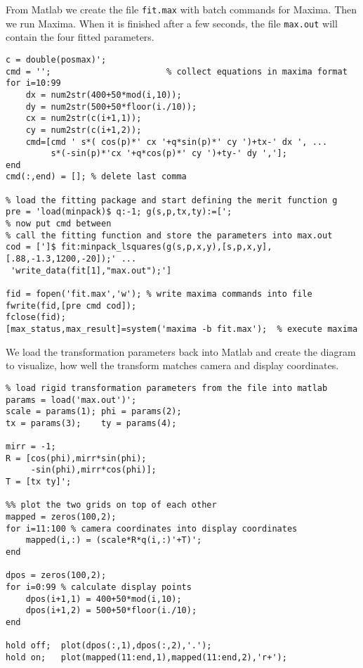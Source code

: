   From Matlab we create the file \verb!fit.max! with batch commands
  for Maxima. Then we run Maxima. When it is finished after a few
  seconds, the file \verb!max.out! will contain the four fitted
  parameters.
 
{\small
\begin{verbatim}
c = double(posmax)';
cmd = '';                       % collect equations in maxima format
for i=10:99
    dx = num2str(400+50*mod(i,10));
    dy = num2str(500+50*floor(i./10));
    cx = num2str(c(i+1,1)); 
    cy = num2str(c(i+1,2));
    cmd=[cmd ' s*( cos(p)*' cx '+q*sin(p)*' cy ')+tx-' dx ', ...
         s*(-sin(p)*'cx '+q*cos(p)*' cy ')+ty-' dy ','];
end
cmd(:,end) = []; % delete last comma

% load the fitting package and start defining the merit function g
pre = 'load(minpack)$ q:-1; g(s,p,tx,ty):=[';
% now put cmd between
% call the fitting function and store the parameters into max.out
cod = [']$ fit:minpack_lsquares(g(s,p,x,y),[s,p,x,y],[.88,-1.3,1200,-20]);' ...
 'write_data(fit[1],"max.out");']

fid = fopen('fit.max','w'); % write maxima commands into file 
fwrite(fid,[pre cmd cod]);
fclose(fid);
[max_status,max_result]=system('maxima -b fit.max');  % execute maxima
\end{verbatim}}

  We load the transformation parameters back into Matlab and create
  the diagram  to visualize, how well the
  transform matches camera and display coordinates.

{\small
\begin{verbatim}
% load rigid transformation parameters from the file into matlab
params = load('max.out')'; 
scale = params(1); phi = params(2);
tx = params(3);    ty = params(4);

mirr = -1;
R = [cos(phi),mirr*sin(phi);
     -sin(phi),mirr*cos(phi)];
T = [tx ty]';

%% plot the two grids on top of each other
mapped = zeros(100,2);
for i=11:100 % camera coordinates into display coordinates
    mapped(i,:) = (scale*R*q(i,:)'+T)';
end

dpos = zeros(100,2);
for i=0:99 % calculate display points
    dpos(i+1,1) = 400+50*mod(i,10);
    dpos(i+1,2) = 500+50*floor(i./10);
end

hold off;  plot(dpos(:,1),dpos(:,2),'.');
hold on;   plot(mapped(11:end,1),mapped(11:end,2),'r+');
\end{verbatim}}
